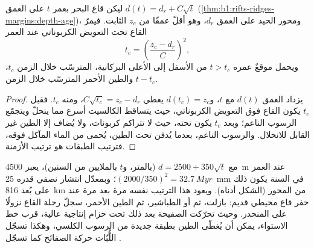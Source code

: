 \begin{proposition}\label{prop:b1:chemical-biogenic-sediments:flank}
ليكن قاع البحر بعمر $t$ على العمق $d(t) = d_r + C\sqrt t$ (\cref{thm:b1:rifts-ridges-margins:depth-age})، ومحور الحيد على العمق $d_r$، وهو أقلّ عمقًا من  $z_c$ الثابت. فيمرّ القاع تحت التعويض الكربوناتي عند العمر
\[
t_c = \left(\frac{z_c - d_r}{C}\right)^2 ,
\]
ويحمل موقعٌ عمره $t > t_c$ من الأسفل إلى الأعلى  البركانية،  المترسّب خلال الزمن $t_c$، والطين الأحمر المترسّب خلال الزمن $t - t_c$.
\end{proposition}

\begin{proof}
يزداد العمق $d(t)$ مع $t$، و$d(t_c) = z_c$ يعطي $C\sqrt{t_c} =
z_c - d_r$، ومنه $t_c$. فقبل $t_c$ يكون القاع فوق التعويض الكربوناتي، حيث يتساقط الكالسيت أسرع مما ينحلّ ويتجمّع الرسوب الناعم؛ وبعد $t_c$ يكون تحته، حيث لا تتراكم كربونات، ولا يُضاف إلا الطين غير القابل للانحلال. والرسوب الناعم، بعدما يُدفن تحت الطين، يُحمى من الماء المآكل فوقه، فترتيب الطبقات هو ترتيب الأزمنة.
\end{proof}

مع $d = 2500 + 350\sqrt t$ (بالمتر، و$t$ بالملايين من السنين)، يعبر  \qty{4500}{m} عند العمر $(2000/350)^2 = \qty{32.7}{Myr}$؛ وبمعدّل انتشار نصفي قدره \qty{25}{mm} في السنة يكون ذلك على بُعد \qty{816}{km} من المحور (الشكل أدناه). ويعود هذا الترتيب نفسه مرة بعد مرة عند حفر قاع محيطي قديم: بازلت، ثم  أو الطباشير، ثم الطين الأحمر، سجلّ رحلة القاع نزولًا على المنحدر. وحيث تحرّكت الصفيحة بعد ذلك تحت حزام إنتاجية عالية، قرب خط الاستواء، يمكن أن يُغطّى الطين بطبقة جديدة من الرسوب الكلسي، وهكذا تسجّل اللُّبّات حركة الصفائح كما تسجّل .


